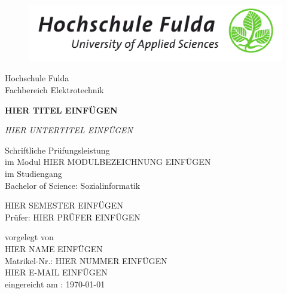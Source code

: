 \begin{titlepage}
\begin{figure}
  \centering
  \includegraphics[width=1.0\textwidth]{res/hs_fulda_logo.png}
\end{figure}
    \centering
    Hochschule Fulda \\    Fachbereich Elektrotechnik
    \vspace{1.5cm}

    {\Huge \bfseries HIER TITEL EINFÜGEN \par}
    {\Large \itshape HIER UNTERTITEL EINFÜGEN \par}
    \vspace{2.5cm}

    Schriftliche Prüfungsleistung\\ im Modul
    HIER MODULBEZEICHNUNG EINFÜGEN\\
    im Studiengang\\ Bachelor of Science: Sozialinformatik \\
    \vspace{0.7cm}

    HIER SEMESTER EINFÜGEN\\

    \vspace{3cm}
    Prüfer: HIER PRÜFER EINFÜGEN\\

    \vfill

    vorgelegt von \\ HIER NAME EINFÜGEN \\ Matrikel-Nr.: HIER NUMMER EINFÜGEN \\ HIER E-MAIL EINFÜGEN \\ eingereicht am : \today
\restoregeometry
\end{titlepage}
